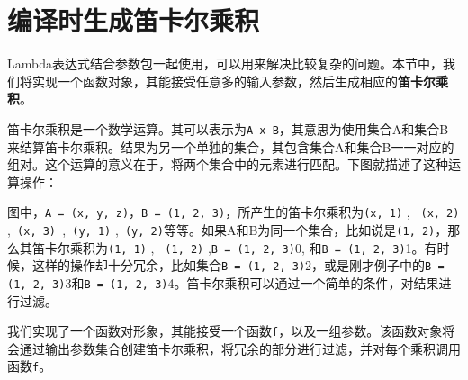 \section{编译时生成笛卡尔乘积}

Lambda表达式结合参数包一起使用，可以用来解决比较复杂的问题。本节中，我们将实现一个函数对象，其能接受任意多的输入参数，然后生成相应的\textbf{笛卡尔乘积}。

笛卡尔乘积是一个数学运算。其可以表示为\texttt{A x B}，其意思为使用集合A和集合B来结算笛卡尔乘积。结果为另一个单独的集合，其包含集合A和集合B一一对应的组对。这个运算的意义在于，将两个集合中的元素进行匹配。下图就描述了这种运算操作：


图中，\texttt{A = (x, y, z)}，\texttt{B = (1, 2, 3)}，所产生的笛卡尔乘积为\texttt{(x, 1)} , \texttt{ (x, 2)} ,\texttt{ (x, 3) },\texttt{ (y, 1)} ,\texttt{ (y, 2)}等等。如果A和B为同一个集合，比如说是\texttt{(1, 2)}，那么其笛卡尔乘积为\texttt{(1, 1)} , \texttt{ (1, 2)} ,\texttt{B = (1, 2, 3)}0, 和\texttt{B = (1, 2, 3)}1。有时候，这样的操作却十分冗余，比如集合\texttt{B = (1, 2, 3)}2，或是刚才例子中的\texttt{B = (1, 2, 3)}3和\texttt{B = (1, 2, 3)}4。笛卡尔乘积可以通过一个简单的条件，对结果进行过滤。


我们实现了一个函数对形象，其能接受一个函数\texttt{f}，以及一组参数。该函数对象将会通过输出参数集合创建笛卡尔乘积，将冗余的部分进行过滤，并对每个乘积调用函数\texttt{f}。

